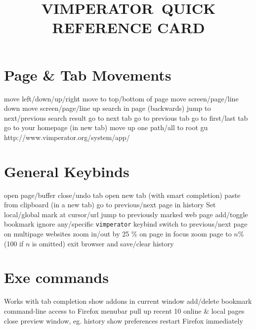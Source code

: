 
\def\content{VIMPERATOR}
\def\versionnumber{1.1}  %

\def\version{v\versionnumber\ \month\ \year}




\title{\uppercase{\content\ quick reference card}}

\shortintro

\vskip 0.5cm

\section{Page \& Tab Movements}{}
	{move left/down/up/right}
	{move to top/bottom of page}
	{move screen/page/line down}
	{move screen/page/line up}
	{search in page (backwards)}
	{jump to next/previous search result}
	{go to next tab}
	{go to previous tab}
	{go to first/last tab}
	{go to your homepage (in new tab)}
	{move up one path/all to root}
	{gu http://www.vimperator.org/system/app/}

\section{General Keybinds}{}
	{open page/buffer}
	{close/undo tab}
	{open new tab (with smart completion)}
	{paste from clipboard (in a new tab)}
	{go to previous/next page in history}
	{Set local/global mark at cursor/url}
	{jump to previously marked web page}
	{add/toggle bookmark}
	{ignore any/specific {\tt vimperator} keybind}
\cmdS{\lbracket\lbracket~\rbracket\rbracket}	{switch to previous/next page on multipage websites}
\cmdS{+~-}	{zoom in/out by 25 \% on page in focus}
	{zoom page to $n$\% (100 if $n$ is omitted)}
	{exit browser and save/clear history}
%
\\
%
\section{Exe commands}{Works with tab completion}
	{show addons in current window}
	{add/delete bookmark}
	{command-line access to Firefox menubar}
	{pull up recent 10 online \& local pages}
	{close preview window, eg. history}
	{show preferences}
	{restart Firefox immediately}

